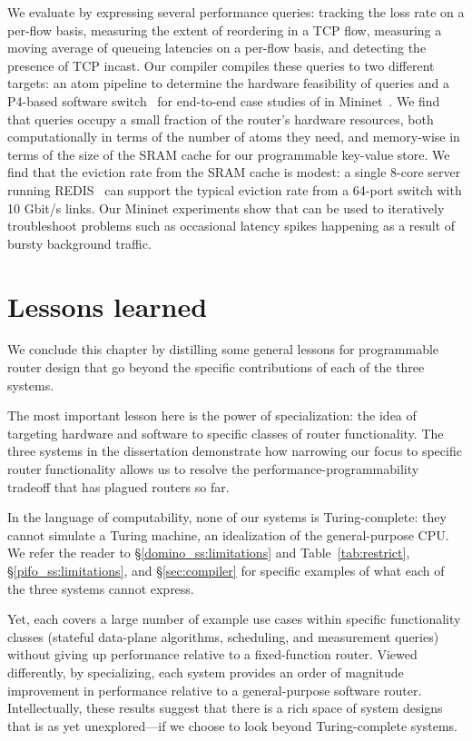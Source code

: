  We evaluate \TheSystem by expressing several performance
queries: tracking the loss rate on a per-flow basis, measuring the extent of
reordering in a TCP flow, measuring a moving average of queueing latencies on a
per-flow basis, and detecting the presence of TCP incast. Our \TheSystem
compiler compiles these queries to two different targets: an atom pipeline to
determine the hardware feasibility of \TheSystem queries and a P4-based
software switch~\cite{p4-bmv2} for end-to-end case studies of \TheSystem
in Mininet~\cite{mininet}. We find that \TheSystem queries occupy a small
fraction of the router's hardware resources, both computationally in terms of
the number of atoms they need, and memory-wise in terms of the size of the SRAM
cache for our programmable key-value store. We find that the eviction rate from
the SRAM cache is modest: a single 8-core server running REDIS~\cite{redis} can
support the typical eviction rate from a 64-port switch with 10 Gbit/s links.
Our Mininet experiments show that \TheSystem can be used to iteratively
troubleshoot problems such as occasional latency spikes happening as a result
of bursty background traffic.

\section{Lessons learned} We conclude this chapter by distilling some general
lessons for programmable router design that go beyond the specific
contributions of each of the three systems.

 The most important lesson here  is the
power of specialization: the idea of targeting hardware and software to
specific classes of router functionality.  The three systems in the
dissertation demonstrate how narrowing our focus to specific router
functionality allows us to resolve the performance-programmability tradeoff
that has plagued routers so far.

In the language of computability, none of our systems is Turing-complete: they
cannot simulate a Turing machine, an idealization of the general-purpose CPU.
We refer the reader to \S\ref{domino_ss:limitations} and
Table~\ref{tab:restrict}, \S\ref{pifo_ss:limitations}, and
\S\ref{sec:compiler} for specific examples of what each of the three
systems cannot express.

Yet, each covers a large number of example use cases within specific
functionality classes (stateful data-plane algorithms, scheduling, and
measurement queries) without giving up performance relative to a fixed-function
router. Viewed differently, by specializing, each system provides an order of
magnitude improvement in performance relative to a general-purpose software
router. Intellectually, these results suggest that there is a rich space of
system designs that is as yet unexplored---if we choose to look beyond
Turing-complete systems. 

